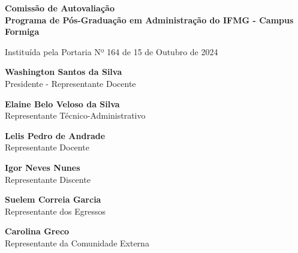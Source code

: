 \begin{center}
    \vspace*{2cm}
    {\Large\textbf{Comissão de Autovaliação}}\\
    \vspace{0.3cm}
    {\Large\textbf{Programa de Pós-Graduação em
Administração do IFMG - Campus Formiga}}
    
    \vspace{0.5cm}
    {\small Instituída pela Portaria Nº 164 de 15 de Outubro de 2024}
    
    \vspace{2cm}
    
    \begin{minipage}{0.8\textwidth}
        \centering
        \textbf{Washington Santos da Silva}\\
        Presidente - Representante Docente
        
        \vspace{1cm}
        
        \textbf{Elaine Belo Veloso da Silva}\\
        Representante Técnico-Administrativo
        
        \vspace{1cm}
        
        \textbf{Lelis Pedro de Andrade}\\
        Representante Docente
        
        \vspace{1cm}
        
        \textbf{Igor Neves Nunes}\\
        Representante Discente
        
        \vspace{1cm}
        
        \textbf{Suelem Correia Garcia}\\
        Representante dos Egressos
        
        \vspace{1cm}
        
        \textbf{Carolina Greco}\\
        Representante da Comunidade Externa
    \end{minipage}
\end{center}


\newpage
\thispagestyle{empty}

